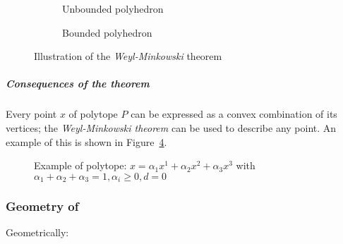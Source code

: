 \documentclass[english]{article}
\begin{document}
\begin{figure}[htbp]
  \centering
  \bigskip
  \begin{subfigure}[h]{0.495\textwidth}
    \centering
    \bigskip
    \caption{Unbounded polyhedron}
    \label{subfig:unbounded-polyhedron}
    \bigskip
  \end{subfigure}
  \begin{subfigure}[h]{0.495\textwidth}
    \centering
    \bigskip
    \caption{Bounded polyhedron}
    \label{subfig:bounded-polyhedron}
    \bigskip
  \end{subfigure}
  \caption{Illustration of the \textit{Weyl-Minkowski} theorem}
  \label{fig:weyl-minkowski-theorem}
  \bigskip
\end{figure}

\subparagraph*{Consequences of the theorem}
Every point \(x\) of polytope \(P\) can be expressed as a convex combination of its vertices;
the \textit{Weyl-Minkowski theorem} can be used to describe any point.
An example of this is shown in Figure~\ref{fig:polytope-example}.

\begin{figure}[htbp]
  \bigskip
  \centering
  \caption{Example of polytope: \(x = \alpha_1 x^1 + \alpha_2 x^2 + \alpha_3 x^3\) with \(\alpha_1 + \alpha_2 + \alpha_3 = 1, \alpha_i \geq 0, d = 0\)}
  \label{fig:polytope-example}
  \bigskip
\end{figure}

\subsubsection{Geometry of \LP}

Geometrically:
\end{document}

